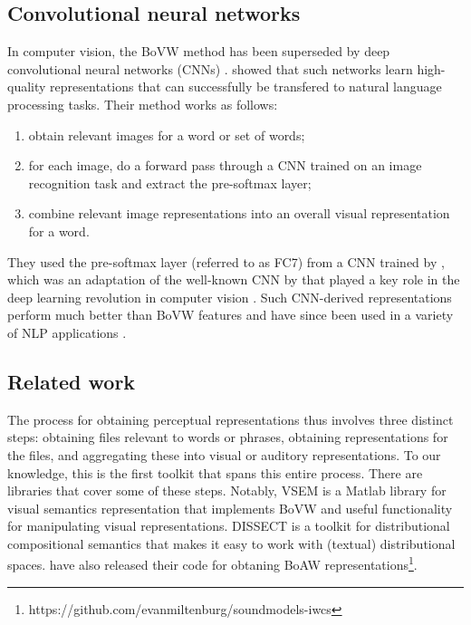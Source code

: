 \documentclass[11pt]{article}
\begin{document}
\subsection{Convolutional neural networks}

In computer vision, the BoVW method has been superseded by deep convolutional neural networks (CNNs) \cite{LeCun:1998cnn,Krizhevsky:2012nips}.  showed that such networks learn high-quality representations that can successfully be transfered to natural language processing tasks. Their method works as follows:

\begin{enumerate}
\item obtain relevant images for a word or set of words;
\vspace{-10pt}
\item for each image, do a forward pass through a CNN trained on an image recognition task and extract the pre-softmax layer;
\vspace{-10pt}
\item combine relevant image representations into an overall visual representation for a word.
\end{enumerate}

\noindent They used the pre-softmax layer (referred to as FC7) from a CNN trained by , which was an adaptation of the well-known CNN by  that played a key role in the deep learning revolution in computer vision \cite{Razavian:2014cnn,LeCun:2015nature}. Such CNN-derived representations perform much better than BoVW features and have since been used in a variety of NLP applications \cite{Kiela:2015emnlp-bli,Lazaridou:2015nips,Shutova:2016naacl,Bulat:2016naacl}.

\subsection{Related work}

The process for obtaining perceptual representations thus involves three distinct steps: obtaining files relevant to words or phrases, obtaining representations for the files, and aggregating these into visual or auditory representations. To our knowledge, this is the first toolkit that spans this entire process. There are libraries that cover some of these steps. Notably, VSEM \cite{Bruni:2013vsem} is a Matlab library for visual semantics representation that implements BoVW and useful functionality for manipulating visual representations. DISSECT \cite{Dinu:2013dissect} is a toolkit for distributional compositional semantics that makes it easy to work with (textual) distributional spaces.  have also released their code for obtaning BoAW representations\footnote{https://github.com/evanmiltenburg/soundmodels-iwcs}.
\end{document}
